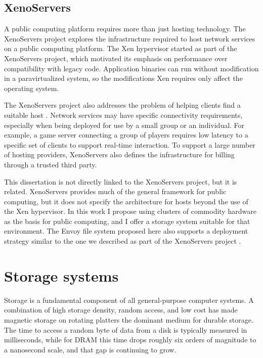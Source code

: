 \subsection{XenoServers}

A public computing platform requires more than just hosting technology. The XenoServers project \cite{reed,kotsovinos04a} explores the infrastructure required to host network services on a public computing platform. The Xen hypervisor started as part of the XenoServers project, which motivated its emphasis on performance over compatibility with legacy code. Application binaries can run without modification in a paravirtualized system, so the modifications Xen requires only affect the operating system.

The XenoServers project also addresses the problem of helping clients find a suitable host \cite{spence}. Network services may have specific connectivity requirements, especially when being deployed for use by a small group or an individual. For example, a game server connecting a group of players requires low latency to a specific set of clients to support real-time interaction. To support a large number of hosting providers, XenoServers also defines the infrastructure for billing through a trusted third party.

This dissertation is not directly linked to the XenoServers project, but it is related. XenoServers provides much of the general framework for public computing, but it does not specify the architecture for hosts beyond the use of the Xen hypervisor. In this work I propose using clusters of commodity hardware as the basis for public computing, and I offer a storage system suitable for that environment. The Envoy file system proposed here also supports a deployment strategy similar to the one we described as part of the XenoServers project \cite{kotsovinos04b}.

\section{Storage systems}

Storage is a fundamental component of all general-purpose computer systems. A combination of high storage density, random access, and low cost has made magnetic storage on rotating platters the dominant medium for durable storage. The time to access a random byte of data from a disk is typically measured in milliseconds, while for DRAM this time drops roughly six orders of magnitude to a nanosecond scale, and that gap is continuing to grow.

